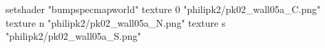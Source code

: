 setshader "bumpspecmapworld"
    texture 0 "philipk2/pk02_wall05a_C.png"
    texture n "philipk2/pk02_wall05a_N.png"
    texture s "philipk2/pk02_wall05a_S.png"